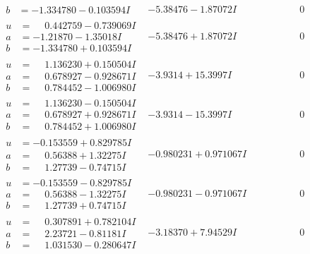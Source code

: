 \documentclass[1p]{elsarticle_modified}
\theoremstyle{definition}
\begin{document}
$$\begin{array}{c|c|c}
\begin{aligned}
b &= -1.334780 - 0.103594 I\end{aligned}
 & -5.38476 - 1.87072 I & \phantom{-0.000000 } 0 \\ \hline\begin{aligned}
u &= \phantom{-}0.442759 - 0.739069 I \\
a &= -1.21870 - 1.35018 I \\
b &= -1.334780 + 0.103594 I\end{aligned}
 & -5.38476 + 1.87072 I & \phantom{-0.000000 } 0 \\ \hline\begin{aligned}
u &= \phantom{-}1.136230 + 0.150504 I \\
a &= \phantom{-}0.678927 - 0.928671 I \\
b &= \phantom{-}0.784452 - 1.006980 I\end{aligned}
 & -3.9314 + 15.3997 I & \phantom{-0.000000 } 0 \\ \hline\begin{aligned}
u &= \phantom{-}1.136230 - 0.150504 I \\
a &= \phantom{-}0.678927 + 0.928671 I \\
b &= \phantom{-}0.784452 + 1.006980 I\end{aligned}
 & -3.9314 - 15.3997 I & \phantom{-0.000000 } 0 \\ \hline\begin{aligned}
u &= -0.153559 + 0.829785 I \\
a &= \phantom{-}0.56388 + 1.32275 I \\
b &= \phantom{-}1.27739 - 0.74715 I\end{aligned}
 & -0.980231 + 0.971067 I & \phantom{-0.000000 } 0 \\ \hline\begin{aligned}
u &= -0.153559 - 0.829785 I \\
a &= \phantom{-}0.56388 - 1.32275 I \\
b &= \phantom{-}1.27739 + 0.74715 I\end{aligned}
 & -0.980231 - 0.971067 I & \phantom{-0.000000 } 0 \\ \hline\begin{aligned}
u &= \phantom{-}0.307891 + 0.782104 I \\
a &= \phantom{-}2.23721 - 0.81181 I \\
b &= \phantom{-}1.031530 - 0.280647 I\end{aligned}
 & -3.18370 + 7.94529 I & \phantom{-0.000000 } 0 \\ \hline\begin{aligned}

\end{aligned}
\end{array}$$
\end{document}
